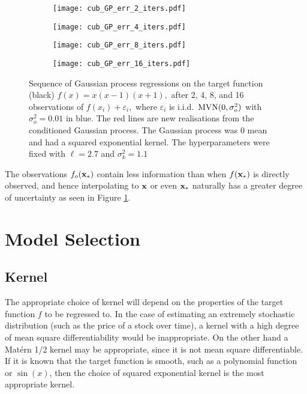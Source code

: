 \begin{figure}[htbp]
    \centering
    \begin{subfigure}[b]{0.5\textwidth}
        \centering
        \texttt{[image: cub\_GP\_err\_2\_iters.pdf]}
    \end{subfigure}%
    \hfill%
    \begin{subfigure}[b]{0.5\textwidth}
        \centering
        \texttt{[image: cub\_GP\_err\_4\_iters.pdf]}
    \end{subfigure}
    \begin{subfigure}[b]{0.5\textwidth}
        \centering
        \texttt{[image: cub\_GP\_err\_8\_iters.pdf]}
    \end{subfigure}%
    \hfill%
    \begin{subfigure}[b]{0.5\textwidth}
        \centering
        \texttt{[image: cub\_GP\_err\_16\_iters.pdf]}
    \end{subfigure}%
    \caption{
        Sequence of Gaussian process regressions on the target function
        (black) $f(x) = x(x-1)(x+1),$ after 2, 4, 8, and 16 observations of
        $f(x_i) + \varepsilon_i,$ where $\varepsilon_i$ is i.i.d.\
        $\operatorname{MVN}(0, \sigma^2_o)$ with $\sigma^2_o = 0.01$
        in blue. The red lines are new realisations from the conditioned
        Gaussian process. The Gaussian process was 0 mean and had a squared
        exponential kernel. The hyperparameters were fixed with $\ell = 2.7$
        and $\sigma^2_k = 1.1$
    }
    \label{fig:var_cub_reg}
\end{figure}

The observations $f_o(\mathbf{x}_*)$ contain less information than when $f(\mathbf{x}_*)$
is directly observed, and hence interpolating to $\mathbf{x}$ or even $\mathbf{x}_*$
naturally has a
greater degree of uncertainty as seen in Figure \ref{fig:var_cub_reg}.

\section{Model Selection}

\subsection*{Kernel}

The appropriate choice of kernel will depend on the properties of the
target function $f$ to be regressed to. In the case of estimating an extremely
stochastic distribution (such as the price of a stock over time), a
kernel with a high degree of mean square differentiability would be
inappropriate. On the other hand a Mat\'ern 1/2 kernel may be appropriate,
since it is not mean square differentiable. If it is known that the target
function is smooth, such as a polynomial function or $\sin(x)$,
then the choice of squared
exponential kernel is the most appropriate kernel.

